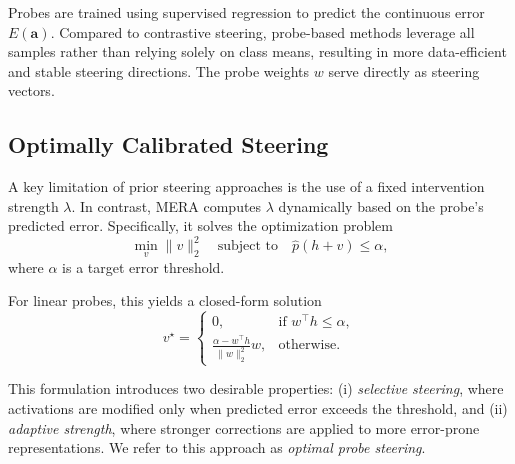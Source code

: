\documentclass[sigconf]{acmart}
\begin{document}
Probes are trained using supervised regression to predict the continuous error $E(\mathbf{a})$. Compared to contrastive steering, probe-based methods leverage all samples rather than relying solely on class means, resulting in more data-efficient and stable steering directions. The probe weights $w$ serve directly as steering vectors.

\subsection{Optimally Calibrated Steering}

A key limitation of prior steering approaches is the use of a fixed intervention strength $\lambda$. In contrast, MERA computes $\lambda$ dynamically based on the probe’s predicted error. Specifically, it solves the optimization problem
\begin{equation}
\min_{v} \|v\|_2^2
\quad \text{subject to} \quad
\hat{p}(h + v) \le \alpha,
\end{equation}
where $\alpha$ is a target error threshold.

For linear probes, this yields a closed-form solution
\begin{equation}
v^\star =
\begin{cases}
0, & \text{if } w^\top h \le \alpha, \\
\displaystyle \frac{\alpha - w^\top h}{\|w\|_2^2} w, & \text{otherwise}.
\end{cases}
\end{equation}

This formulation introduces two desirable properties: (i) \emph{selective steering}, where activations are modified only when predicted error exceeds the threshold, and (ii) \emph{adaptive strength}, where stronger corrections are applied to more error-prone representations. We refer to this approach as \emph{optimal probe steering}.


\end{document}
